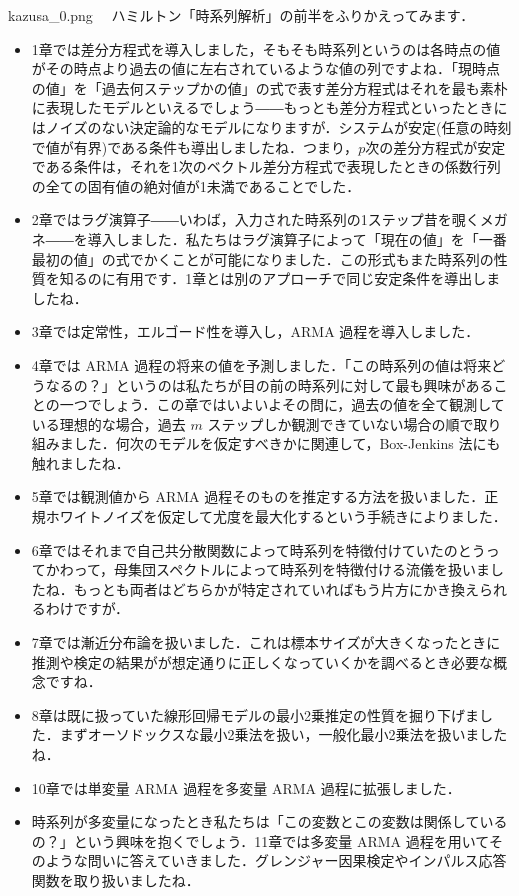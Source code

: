 \documentclass[b5paper,xelatex,ja=standard,10pt]{bxjsarticle}
\begin{document}
\begin{SERIFU}[colback=PaleIris]{kazusa_0.png}
　ハミルトン「時系列解析」\cite{hamilton1994}の前半をふりかえってみます．
\vspace{-0.3\baselineskip}
\begin{itemize}
  \item 1章では差分方程式を導入しました，そもそも時系列というのは各時点の値がその時点より過去の値に左右されているような値の列ですよね．「現時点の値」を「過去何ステップかの値」の式で表す差分方程式はそれを最も素朴に表現したモデルといえるでしょう――もっとも差分方程式といったときにはノイズのない決定論的なモデルになりますが．システムが安定(任意の時刻で値が有界)である条件も導出しましたね．つまり，$p$次の差分方程式が安定である条件は，それを1次のベクトル差分方程式で表現したときの係数行列の全ての固有値の絶対値が1未満であることでした．
  \item 2章ではラグ演算子――いわば，入力された時系列の1ステップ昔を覗くメガネ――を導入しました．私たちはラグ演算子によって「現在の値」を「一番最初の値」の式でかくことが可能になりました．この形式もまた時系列の性質を知るのに有用です．1章とは別のアプローチで同じ安定条件を導出しましたね．
  \item 3章では定常性，エルゴード性を導入し，ARMA 過程を導入しました．
  \item 4章では ARMA 過程の将来の値を予測しました．{「この時系列の値は将来どうなるの？」}というのは私たちが目の前の時系列に対して最も興味があることの一つでしょう．この章ではいよいよその問に，過去の値を全て観測している理想的な場合，過去 $m$ ステップしか観測できていない場合の順で取り組みました．何次のモデルを仮定すべきかに関連して，Box-Jenkins 法にも触れましたね．
  \item 5章では観測値から ARMA 過程そのものを推定する方法を扱いました．正規ホワイトノイズを仮定して尤度を最大化するという手続きによりました．
  \item 6章ではそれまで自己共分散関数によって時系列を特徴付けていたのとうってかわって，母集団スペクトルによって時系列を特徴付ける流儀を扱いましたね．もっとも両者はどちらかが特定されていればもう片方にかき換えられるわけですが．
  \item 7章では漸近分布論を扱いました．これは標本サイズが大きくなったときに推測や検定の結果がが想定通りに正しくなっていくかを調べるとき必要な概念ですね．
  \item 8章は既に扱っていた線形回帰モデルの最小2乗推定の性質を掘り下げました．まずオーソドックスな最小2乗法を扱い，一般化最小2乗法を扱いましたね．
  \item 10章では単変量 ARMA 過程を多変量 ARMA 過程に拡張しました．
  \item 時系列が多変量になったとき私たちは{「この変数とこの変数は関係しているの？」}という興味を抱くでしょう．11章では多変量 ARMA 過程を用いてそのような問いに答えていきました．グレンジャー因果検定やインパルス応答関数を取り扱いましたね．
\end{itemize}
\end{SERIFU}
\end{document}
